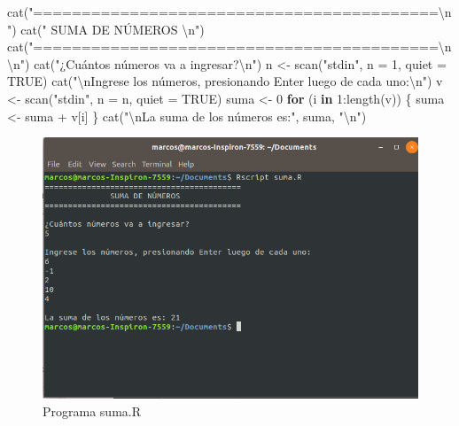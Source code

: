 \documentclass[
]{book}
\newenvironment{Shaded}{\begin{snugshade}}{\end{snugshade}}
\newcommand{\AttributeTok}[1]{\textcolor[rgb]{0.77,0.63,0.00}{#1}}
\newcommand{\ConstantTok}[1]{\textcolor[rgb]{0.00,0.00,0.00}{#1}}
\newcommand{\ControlFlowTok}[1]{\textcolor[rgb]{0.13,0.29,0.53}{\textbf{#1}}}
\newcommand{\DecValTok}[1]{\textcolor[rgb]{0.00,0.00,0.81}{#1}}
\newcommand{\FunctionTok}[1]{\textcolor[rgb]{0.00,0.00,0.00}{#1}}
\newcommand{\NormalTok}[1]{#1}
\newcommand{\OtherTok}[1]{\textcolor[rgb]{0.56,0.35,0.01}{#1}}
\newcommand{\SpecialCharTok}[1]{\textcolor[rgb]{0.00,0.00,0.00}{#1}}
\newcommand{\StringTok}[1]{\textcolor[rgb]{0.31,0.60,0.02}{#1}}
\begin{document}
\begin{Shaded}
\begin{Highlighting}[]
\FunctionTok{cat}\NormalTok{(}\StringTok{"==========================================}\SpecialCharTok{\textbackslash{}n}\StringTok{"}\NormalTok{)}
\FunctionTok{cat}\NormalTok{(}\StringTok{"              SUMA DE NÚMEROS             }\SpecialCharTok{\textbackslash{}n}\StringTok{"}\NormalTok{)}
\FunctionTok{cat}\NormalTok{(}\StringTok{"==========================================}\SpecialCharTok{\textbackslash{}n\textbackslash{}n}\StringTok{"}\NormalTok{)}
\FunctionTok{cat}\NormalTok{(}\StringTok{"¿Cuántos números va a ingresar?}\SpecialCharTok{\textbackslash{}n}\StringTok{"}\NormalTok{)}
\NormalTok{n }\OtherTok{\textless{}{-}} \FunctionTok{scan}\NormalTok{(}\StringTok{"stdin"}\NormalTok{, }\AttributeTok{n =} \DecValTok{1}\NormalTok{, }\AttributeTok{quiet =} \ConstantTok{TRUE}\NormalTok{)}
\FunctionTok{cat}\NormalTok{(}\StringTok{"}\SpecialCharTok{\textbackslash{}n}\StringTok{Ingrese los números, presionando Enter luego de cada uno:}\SpecialCharTok{\textbackslash{}n}\StringTok{"}\NormalTok{)}
\NormalTok{v }\OtherTok{\textless{}{-}} \FunctionTok{scan}\NormalTok{(}\StringTok{"stdin"}\NormalTok{, }\AttributeTok{n =}\NormalTok{ n, }\AttributeTok{quiet =} \ConstantTok{TRUE}\NormalTok{)}
\NormalTok{suma }\OtherTok{\textless{}{-}} \DecValTok{0}
\ControlFlowTok{for}\NormalTok{ (i }\ControlFlowTok{in} \DecValTok{1}\SpecialCharTok{:}\FunctionTok{length}\NormalTok{(v)) \{}
\NormalTok{    suma }\OtherTok{\textless{}{-}}\NormalTok{ suma }\SpecialCharTok{+}\NormalTok{ v[i]}
\NormalTok{\}}
\FunctionTok{cat}\NormalTok{(}\StringTok{"}\SpecialCharTok{\textbackslash{}n}\StringTok{La suma de los números es:"}\NormalTok{, suma, }\StringTok{"}\SpecialCharTok{\textbackslash{}n}\StringTok{"}\NormalTok{)}
\end{Highlighting}
\end{Shaded}

\begin{figure}

{\centering \includegraphics[width=0.8\linewidth]{images/07_otros/consola4} 

}

\caption{Programa suma.R}\label{fig:unnamed-chunk-167}
\end{figure}
\end{document}
